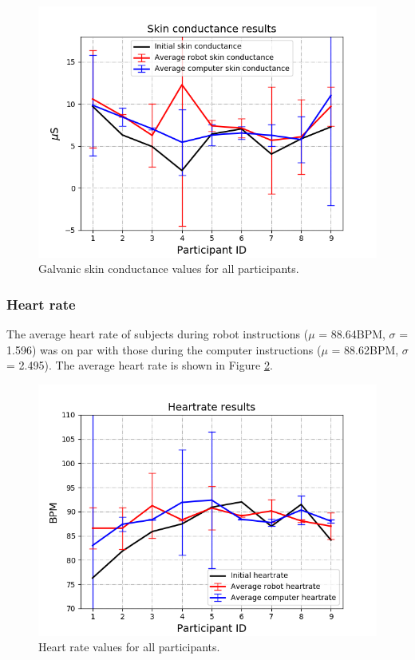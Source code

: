 \documentclass[conference]{IEEEtran}
\begin{document}
\begin{figure}[h]
	\flushleft 
	\includegraphics[width=1\linewidth]{figures/conductance.png}
	\caption{\label{fig:skin_conductance}Galvanic skin conductance values for all participants.}  
\end{figure}


\subsubsection{Heart rate} The average heart rate of subjects during robot instructions ($\mu$ = 88.64BPM, $\sigma$ = 1.596) was on par with those during the computer instructions ($\mu$ = 88.62BPM, $\sigma$ = 2.495). The average heart rate is shown in Figure \ref{fig:heart_rate}.

\begin{figure}[h]
	\flushleft 
	\includegraphics[width=1\linewidth]{figures/heartrate.png}
	\caption{\label{fig:heart_rate}Heart rate values for all participants.}  
\end{figure}
\end{document}
